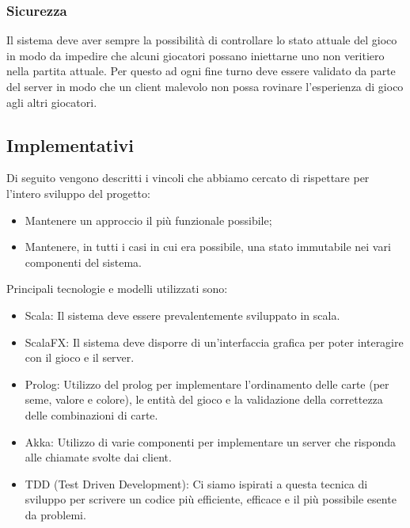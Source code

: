 \subsubsection{Sicurezza}
Il sistema deve aver sempre la possibilità di controllare lo stato attuale del gioco in modo da impedire che alcuni giocatori possano iniettarne uno non veritiero nella partita attuale.
Per questo ad ogni fine turno deve essere validato da parte del server in modo che un client malevolo non possa rovinare l’esperienza di gioco agli altri giocatori.

\subsection{Implementativi}
Di seguito vengono descritti i vincoli che abbiamo cercato di rispettare per l’intero sviluppo del progetto:
\begin{itemize}
    \item Mantenere un approccio il più funzionale possibile;
    \item Mantenere, in tutti i casi in cui era possibile, una stato immutabile nei vari componenti del sistema.
\end{itemize}
Principali tecnologie e modelli utilizzati sono:
\begin{itemize}
    \item Scala: Il sistema deve essere prevalentemente sviluppato in scala.
    \item ScalaFX: Il sistema deve disporre di un’interfaccia grafica per poter interagire con il gioco e il server.
    \item Prolog: Utilizzo del prolog per implementare l’ordinamento delle carte (per seme, valore e colore), le entità del gioco e la validazione della correttezza delle combinazioni di carte.
    \item Akka: Utilizzo di varie componenti per implementare un server che risponda alle chiamate svolte dai client.
    \item TDD (Test Driven Development): Ci siamo ispirati a questa tecnica di sviluppo per scrivere un codice più efficiente, efficace e il più possibile esente da problemi.
\end{itemize}
\newpage